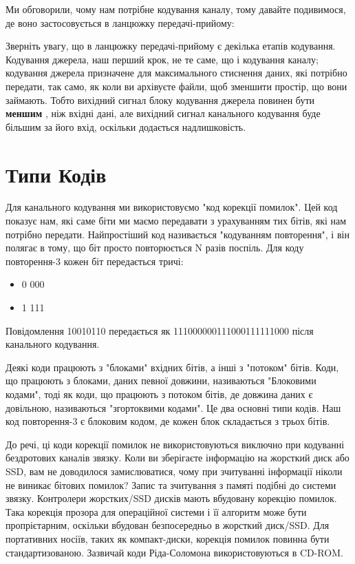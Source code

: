 Ми обговорили, чому нам потрібне кодування каналу, тому давайте
подивимося, де воно застосовується в ланцюжку передачі-прийому:

\href{../_images/tx_rx_chain.svg}{}

Зверніть увагу, що в ланцюжку передачі-прийому є декілька етапів
кодування. Кодування джерела, наш перший крок, не те саме, що і
кодування каналу; кодування джерела призначене для максимального
стиснення даних, які потрібно передати, так само, як коли ви архівуєте
файли, щоб зменшити простір, що вони займають. Тобто вихідний сигнал
блоку кодування джерела повинен бути \textbf{меншим} , ніж вхідні дані,
але вихідний сигнал канального кодування буде більшим за його вхід,
оскільки додається надлишковість.

\section{Типи
Кодів}\label{ux442ux438ux43fux438-ux43aux43eux434ux456ux432}

Для канального кодування ми використовуємо "код корекції помилок". Цей
код показує нам, які саме біти ми маємо передавати з урахуванням тих
бітів, які нам потрібно передати. Найпростіший код називається
"кодуванням повторення", і він полягає в тому, що біт просто
повторюється N разів поспіль. Для коду повторення-3 кожен біт
передається тричі:

\begin{itemize}
\tightlist
\item
  0 000
\item
  1 111
\end{itemize}

Повідомлення 10010110 передається як 111000000111000111111000 після
канального кодування.

Деякі коди працюють з "блоками" вхідних бітів, а інші з "потоком" бітів.
Коди, що працюють з блоками, даних певної довжини, називаються
"Блоковими кодами", тоді як коди, що працюють з потоком бітів, де
довжина даних є довільною, називаються "згортоквими кодами". Це два
основні типи кодів. Наш код повторення-3 є блоковим кодом, де кожен блок
складається з трьох бітів.

До речі, ці коди корекції помилок не використовуються виключно при
кодуванні бездротових каналів зв\textquotesingle язку. Коли ви
зберігаєте інформацію на жорсткий диск або SSD, вам не доводилося
замислюватися, чому при зчитуванні інформації ніколи не виникає бітових
помилок? Запис та зчитування з пам\textquotesingle яті подібні до
системи зв\textquotesingle язку. Контролери жорстких/SSD дисків мають
вбудовану корекцію помилок. Така корекція прозора для операційної
системи і її алгоритм може бути пропрієтарним, оскільки вбудован
безпосередньо в жорсткий диск/SSD. Для портативних носіїв, таких як
компакт-диски, корекція помилок повинна бути стандартизованою. Зазвичай
коди Ріда-Соломона використовуються в CD-ROM.

